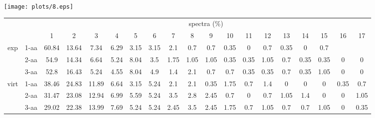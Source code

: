 \documentclass{article}
\begin{document}
\texttt{[image: plots/8.eps]}\begin{table}[h]\tiny
\vspace{3mm}
{\centering
\begin{center}
\begin{tabular}{|c|l|c|c|c|c|c|c|c|c|c|c|c|c|c|c|c|c|c|}
  \hline
  \multicolumn{2}{|c|}{ } & \multicolumn{ 17 }{|c|}{ spectra (\%)} \\
  \cline{3- 19}
  \multicolumn{2}{|c|}{ }  & 1 & 2 & 3 & 4 & 5 & 6 & 7 & 8 & 9 & 10 & 11 & 12 & 13 & 14 & 15 & 16 & 17\\
  \hline
  \multirow{3}{*}{exp}
&  1-aa  & 60.84 & 13.64 & 7.34 & 6.29 & 3.15 & 3.15 & 2.1 & 0.7 & 0.7 & 0.35 & 0 & 0.7 & 0.35 & 0 & 0.7 &  & \\&  2-aa  & 54.9 & 14.34 & 6.64 & 5.24 & 8.04 & 3.5 & 1.75 & 1.05 & 1.05 & 0.35 & 0.35 & 1.05 & 0.7 & 0.35 & 0.35 & 0 & 0\\&  3-aa  & 52.8 & 16.43 & 5.24 & 4.55 & 8.04 & 4.9 & 1.4 & 2.1 & 0.7 & 0.7 & 0.35 & 0.35 & 0.7 & 0.35 & 1.05 & 0 & 0\\ \hline
  \multirow{3}{*}{virt} 
&  1-aa  & 38.46 & 24.83 & 11.89 & 6.64 & 3.15 & 5.24 & 2.1 & 2.1 & 0.35 & 1.75 & 0.7 & 1.4 & 0 & 0 & 0 & 0.35 & 0.7\\&  2-aa  & 31.47 & 23.08 & 12.94 & 6.99 & 5.59 & 5.24 & 3.5 & 2.8 & 2.45 & 0.7 & 0 & 0.7 & 1.05 & 1.4 & 0 & 0 & 1.05\\&  3-aa  & 29.02 & 22.38 & 13.99 & 7.69 & 5.24 & 5.24 & 2.45 & 3.5 & 2.45 & 1.75 & 0.7 & 1.05 & 0.7 & 0.7 & 1.05 & 0 & 0.35\\ \hline
\end{tabular}
\end{center}
\par}
\centering
\vspace{3mm}
\label{table:table8}
\end{table}
\end{document}
